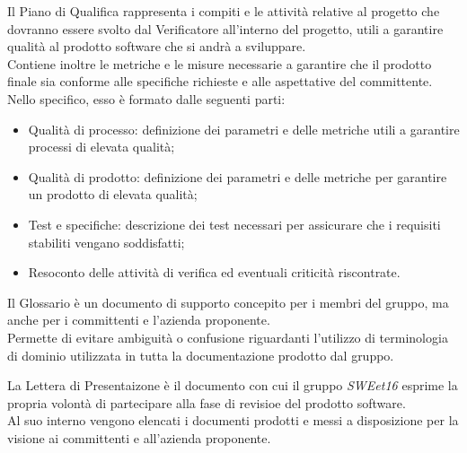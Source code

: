 
    Il Piano di Qualifica rappresenta i compiti e le attività relative al progetto che dovranno essere svolto dal Verificatore all'interno del progetto,
    utili a garantire qualità al prodotto software che si andrà a sviluppare. \\
    Contiene inoltre le metriche e le misure necessarie a garantire che il prodotto finale sia conforme alle specifiche richieste e alle aspettative del committente. \\

    Nello specifico, esso è formato dalle seguenti parti:
    \begin{itemize}
        \item Qualità di processo: definizione dei parametri e delle metriche utili a garantire processi di elevata qualità;
        \item Qualità di prodotto: definizione dei parametri e delle metriche per garantire un prodotto di elevata qualità;
        \item Test e specifiche: descrizione dei test necessari per assicurare che i requisiti stabiliti vengano soddisfatti;
        \item Resoconto delle attività di verifica ed eventuali criticità riscontrate.
    \end{itemize}
    

 
    Il Glossario è un documento di supporto concepito per i membri del gruppo, ma anche per i committenti e l'azienda proponente. \\
    Permette di evitare ambiguità o confusione riguardanti l'utilizzo di terminologia di dominio utilizzata in tutta la documentazione prodotto dal gruppo.



    La Lettera di Presentaizone è il documento con cui il gruppo \textit{SWEet16} esprime la propria volontà di partecipare alla fase di revisioe del prodotto software. \\
    Al suo interno vengono elencati i documenti prodotti e messi a disposizione per la visione ai committenti e all'azienda proponente. 

